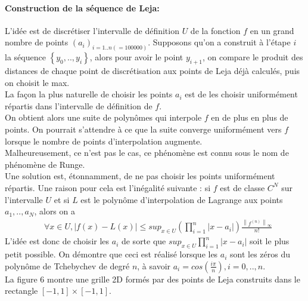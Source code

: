 \paragraph{Construction de la séquence de Leja:\\}
\hspace{0.5cm} L'idée est de discrétiser l'intervalle de définition $U$ de la fonction $f$ en un grand nombre de points $(a_i)_{i=1..n(=100000)}$. Supposons qu'on a construit à l'étape $i$ la séquence $\left \{ y_0,..,y_i \right \}$, alors pour avoir le point $y_{i+1}$, on compare le produit des distances de chaque point de discrétisation aux points de Leja déjà calculés, puis on choisit le max.\\
La façon la plus naturelle de choisir les points $a_i$ est de les choisir uniformément répartis dans l'intervalle de définition de $f$.\\
On obtient alors une suite de polynômes qui interpole $f$ en de plus en plus de points. On pourrait s'attendre à ce que la suite converge uniformément vers $f$ lorsque le nombre de points d'interpolation augmente.\\
Malheureusement, ce n'est pas le cas, ce phénomène est connu sous le nom de phénomène de Runge. \\
Une solution est, étonnamment, de ne pas choisir les points uniformément répartis. Une raison pour cela est l'inégalité suivante : si $f$ est de classe $C^N$ sur l'intervalle $U$ et si $L$ est le polynôme d'interpolation de Lagrange aux points $a_1,..,a_N$, alors on a
\begin{align}
		& \forall x \in U, \left |f(x)-L(x)\right | \leq sup_{x \in U}  (\prod_{i=1}^n \left | x-a_i \right |) \frac{\left \|f^{(n)} \right \|_{\infty}}{n!} \nonumber
\end{align}
\hspace{0.5cm}
L'idée est donc de choisir les $a_i$ de sorte que $sup_{x \in U} \prod_{i=1}^n \left | x-a_i \right |$ soit le plus petit possible. On démontre que ceci est réalisé lorsque les $a_i$ sont les zéros du polynôme de Tchebychev de degré $n$, à savoir $a_i = cos(\frac{i \pi}{n}), i=0,..,n$.\\
La figure 6 montre une grille 2D formés par des points de Leja construits dans le rectangle $\left [-1,1 \right ] \times \left [-1,1 \right ]$.\\
